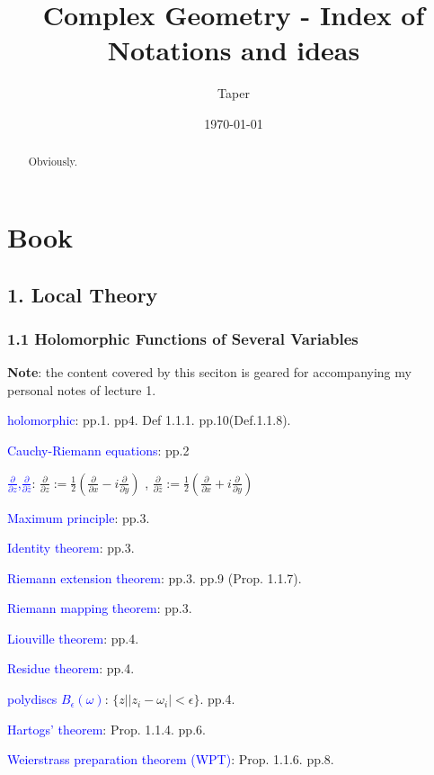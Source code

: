 \documentclass{article}
\title{Complex Geometry - Index of Notations and ideas}
\date{\today}
\author{Taper}
\numberwithin{equation}{subsection} %
\begin{document}
\maketitle
\tableofcontents

\begin{abstract}
Obviously. 

\end{abstract}

\section{Book}
	\subsection{1. Local Theory}
		\subsubsection{1.1 Holomorphic Functions of Several Variables}
		\label{sec:1.1_book}
		\textbf{Note}: the content covered by this seciton is geared for accompanying my personal notes of lecture 1.
		
		\textcolor{blue}{holomorphic}: pp.1. pp4. Def 1.1.1. pp.10(Def.1.1.8).
		
		\textcolor{blue}{Cauchy-Riemann equations}: pp.2
		
		\textcolor{blue}{$\frac{\partial}{\partial z}$,$\frac{\partial}{\partial \bar{z}}$}:
		$\frac{\partial}{\partial z}:= \frac{1}{2}
				(\frac{\partial}{\partial x} 
				-i \frac{\partial}{\partial y})
				$
		,
		$\frac{\partial}{\partial \bar{z}}:= \frac{1}{2}
		(\frac{\partial}{\partial x} 
		+ i \frac{\partial}{\partial y})
		$
		
		
		\textcolor{blue}{Maximum principle}: pp.3.
		
		\textcolor{blue}{Identity theorem}: pp.3.
		
		\textcolor{blue}{Riemann extension theorem}: pp.3. pp.9 (Prop. 1.1.7).
		
		\textcolor{blue}{Riemann mapping theorem}: pp.3.
		
		\textcolor{blue}{Liouville theorem}: pp.4.
		
		\textcolor{blue}{Residue theorem}: pp.4.
		
		\textcolor{blue}{polydiscs $B_\epsilon(\omega)$}: $\{z| |z_i-\omega_i| <\epsilon\} $.  pp.4.
		
		\textcolor{blue}{Hartogs' theorem}: Prop. 1.1.4. pp.6.
		
		\textcolor{blue}{Weierstrass preparation theorem (WPT)}:
		Prop. 1.1.6. pp.8.
		
\end{document}
